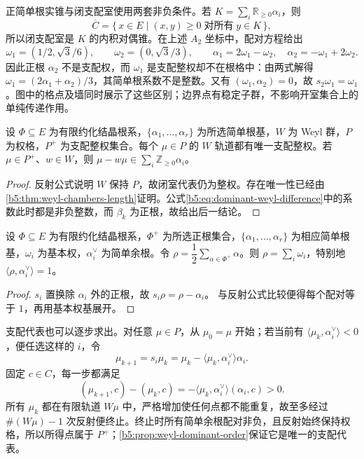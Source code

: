 \ProseParagraphBreak

正简单根实锥与闭支配室使用两套非负条件。若 \(K=\sum_i\mathbb R_{\ge0}\alpha_i\)，则
\[
	\overline C=\{\,x\in E\mid(x,y)\ge0\;\text{对所有}\;y\in K\,\},
\]
所以闭支配室是 \(K\) 的内积对偶锥。在上述 \(A_2\) 坐标中，配对方程给出
\[
	\omega_1=(1/2,\sqrt3/6),\qquad \omega_2=(0,\sqrt3/3), \qquad \alpha_1=2\omega_1-\omega_2,\quad \alpha_2=-\omega_1+2\omega_2.
\]
因此正根 \(\alpha_2\) 不是支配权，而 \(\omega_1\) 是支配整权却不在根格中：由两式解得 \(\omega_1=(2\alpha_1+\alpha_2)/3\)，其简单根系数不是整数。又有 \((\omega_1,\alpha_2)=0\)，故 \(s_2\omega_1=\omega_1\)。图中的格点及墙同时展示了这些区别；边界点有稳定子群，不影响开室集合上的单纯传递作用。



\begin{proposition}\label{b5:prop:weyl-dominant-order}
	设 \(\Phi\subseteq E\) 为有限约化结晶根系，\(\{\alpha_1,\ldots,\alpha_r\}\) 为所选简单根基，\(W\) 为 Weyl 群，\(P\) 为权格，\(P^+\) 为支配整权集合。每个 \(\mu\in P\) 的 \(W\) 轨道都有唯一支配整权。若 \(\mu\in P^+\)、\(w\in W\)，则 \(\mu-w\mu\in\sum_i\mathbb Z_{\geq0}\alpha_i\)。
\end{proposition}
\begin{proof}
	反射公式说明 \(W\) 保持 \(P\)，故闭室代表仍为整权。存在唯一性已经由\cref{b5:thm:weyl-chambers-length}证明。公式\eqref{b5:eq:dominant-weyl-difference}中的系数此时都是非负整数，而 \(\beta_k\) 为正根，故给出后一结论。
\end{proof}

\begin{proposition}\label{b5:prop:rho-coroot}
	设 \(\Phi\subseteq E\) 为有限约化结晶根系，\(\Phi^+\) 为所选正根集合，\(\{\alpha_1,\ldots,\alpha_r\}\) 为相应简单根基，\(\omega_i\) 为基本权，\(\alpha_i^\vee\) 为简单余根。令 \(\rho=\dfrac12\sum_{\alpha\in\Phi^+}\alpha\)。则 \(\rho=\sum_i\omega_i\)，特别地 \(\langle\rho,\alpha_i^\vee\rangle=1\)。
\end{proposition}
\begin{proof}
	\(s_i\) 置换除 \(\alpha_i\) 外的正根，故 \(s_i\rho=\rho-\alpha_i\)。 与反射公式比较便得每个配对等于 \(1\)，再用基本权基展开。
\end{proof}

支配代表也可以逐步求出。对任意 \(\mu\in P\)，从 \(\mu_0=\mu\) 开始；若当前有 \(\langle\mu_k,\alpha_i^\vee\rangle<0\)，便任选这样的 \(i\)，令
\[
	\mu_{k+1}=s_i\mu_k =\mu_k-\langle\mu_k,\alpha_i^\vee\rangle\alpha_i.
\]
固定 \(c\in C\)，每一步都满足
\[
	(\mu_{k+1},c)-(\mu_k,c) =-\langle\mu_k,\alpha_i^\vee\rangle(\alpha_i,c)>0.
\]
所有 \(\mu_k\) 都在有限轨道 \(W\mu\) 中，严格增加使任何点都不能重复，故至多经过 \(\#(W\mu)-1\) 次反射便终止。终止时所有简单余根配对非负，且反射始终保持权格，所以所得点属于 \(P^+\)；\cref{b5:prop:weyl-dominant-order}保证它是唯一的支配代表。

